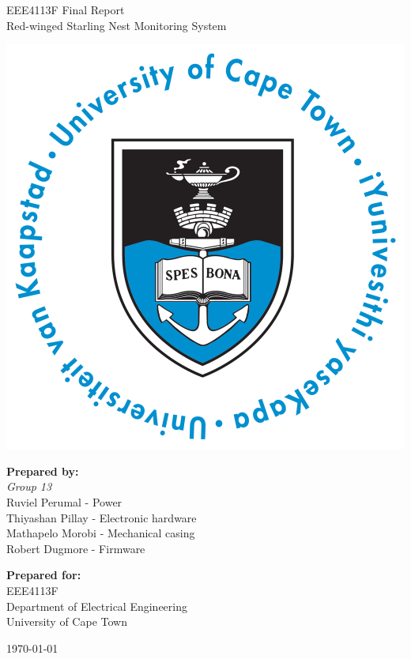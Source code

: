 \thispagestyle{empty}
\begin{center}
    
\Huge

\vspace{5cm}

EEE4113F Final Report \\
Red-winged Starling Nest Monitoring System

\vspace{2.5cm}

\includegraphics[width=0.4\linewidth]{FrontMatter/UCT_logo.png}

\vfill

\large
\textbf{Prepared by:}\\
\textit{Group 13} \\
Ruviel Perumal - Power\\
Thiyashan Pillay - Electronic hardware \\
Mathapelo Morobi - Mechanical casing\\
Robert Dugmore - Firmware\\





\vspace{1cm}

\textbf{Prepared for:}\\
EEE4113F\\
Department of Electrical Engineering\\
University of Cape Town

\vspace{2cm}

\today


\end{center}
